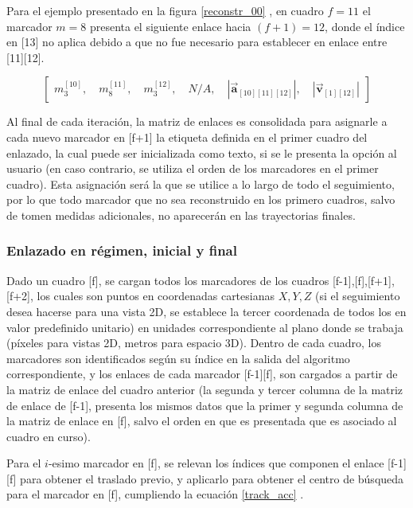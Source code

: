 Para el ejemplo presentado en la figura \ref{reconstr_00} , en cuadro $f=11$ el marcador $m=8$ presenta el siguiente enlace hacia $(f+1)=12$, donde el índice en [13] no aplica debido a que no fue necesario para establecer en enlace entre [11][12].

\begin{equation}
\begin{bmatrix}
  m_{3}^{[10]} ,\quad m_{8}^{[11]} ,\quad m_{3}^{[12]} ,\quad N/A ,\quad \left|\boldsymbol{\overrightarrow{a}}_{[10][11][12]}\right| ,\quad \left|\boldsymbol{\overrightarrow{v}}_{[1][12]}\right|
\end{bmatrix}
\end{equation}

Al final de cada iteración, la matriz de enlaces es consolidada para asignarle a cada nuevo marcador en [f+1] la etiqueta definida en el primer cuadro del enlazado, la cual puede ser inicializada como texto, si se le presenta la opción al usuario (en caso contrario, se utiliza el orden de los marcadores en el primer cuadro). Esta asignación será la que se utilice a lo largo de todo el seguimiento, por lo que todo marcador que no sea reconstruido en los primero cuadros, salvo de tomen medidas adicionales, no aparecerán en las trayectorias finales.

\subsubsection{Enlazado en régimen, inicial y final}

Dado un cuadro [f], se cargan todos los marcadores de los cuadros [f-1],[f],[f+1],[f+2], los cuales son puntos en coordenadas cartesianas $X,Y,Z$ (si el seguimiento desea hacerse para una vista 2D, se establece la tercer coordenada de todos los en valor predefinido unitario) en unidades correspondiente al plano donde se trabaja (píxeles para vistas 2D, metros para espacio 3D). Dentro de cada cuadro, los marcadores son identificados según su índice en la salida del algoritmo correspondiente, y los enlaces de cada marcador [f-1][f], son cargados a partir de la matriz de enlace del cuadro anterior (la segunda y tercer columna de la matriz de enlace de [f-1], presenta los mismos datos que la primer y segunda columna de la matriz de enlace en [f], salvo el orden en que es presentada que es asociado al cuadro en curso).

Para el $i$-esimo marcador en [f], se relevan los índices que componen el enlace [f-1][f] para obtener el traslado previo, y aplicarlo para obtener el centro de búsqueda para el marcador en [f], cumpliendo la ecuación \ref{track_acc} .

